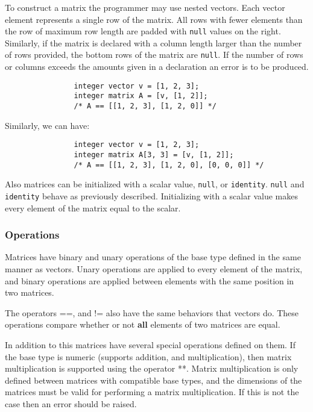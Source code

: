 \documentclass[../../gazprea.tex]{subfiles}
\begin{document}
			To construct a matrix the programmer may use nested vectors. Each vector element represents a single row of
			the matrix. All rows with fewer elements than the row of maximum row length are padded with \texttt{null}
			values on the right. Similarly, if the matrix is declared with a column length larger than the number of
			rows provided, the bottom rows of the matrix are \texttt{null}.  If the number of rows or columns exceeds
			the amounts given in a declaration an error is to be produced.

			\begin{lstlisting}
				integer vector v = [1, 2, 3];
				integer matrix A = [v, [1, 2]];
				/* A == [[1, 2, 3], [1, 2, 0]] */
			\end{lstlisting}

			Similarly, we can have:

			\begin{lstlisting}
				integer vector v = [1, 2, 3];
				integer matrix A[3, 3] = [v, [1, 2]];
				/* A == [[1, 2, 3], [1, 2, 0], [0, 0, 0]] */
			\end{lstlisting}

			Also matrices can be initialized with a scalar value, \texttt{null}, or \texttt{identity}. \texttt{null} and
			\texttt{identity} behave as previously described. Initializing with a scalar value makes every element of
			the matrix equal to the scalar.

		\subsubsection{Operations}

			Matrices have binary and unary operations of the base type defined in the same manner as vectors. Unary
			operations are applied to every element of the matrix, and binary operations are applied between elements
			with the same position in two matrices.

			The operators ==, and != also have the same behaviors that vectors do. These operations compare whether or
			not \textbf{all} elements of two matrices are equal.

			In addition to this matrices have several special operations defined on them.  If the base type is numeric
			(supports addition, and multiplication), then matrix multiplication is supported using the operator **.
			Matrix multiplication is only defined between matrices with compatible base types, and the dimensions of the
			matrices must be valid for performing a matrix multiplication. If this is not the case then an error should
			be raised.
\end{document}
